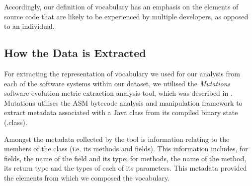 Accordingly, our definition of vocabulary has an emphasis on the elements of source code that are likely to be experienced by multiple developers, as opposed to an individual.









\subsection{How the Data is Extracted} %
\label{sub:how_the_data_is_extracted}

For extracting the representation of vocabulary we used for our analysis from each of the software systems within our dataset, we utilised the \emph{Mutations} software evolution metric extraction analysis tool, which was described in \cite{Vasa10a}. Mutations utilises the ASM bytecode analysis and manipulation framework to extract metadata associated with a Java class from its compiled binary state (.class).

Amongst the metadata collected by the tool is information relating to the members of the class (i.e. its methods and fields). This information includes, for fields, the name of the field and its type; for methods, the name of the method, its return type and the types of each of its parameters. This metadata provided the elements from which we composed the vocabulary.

